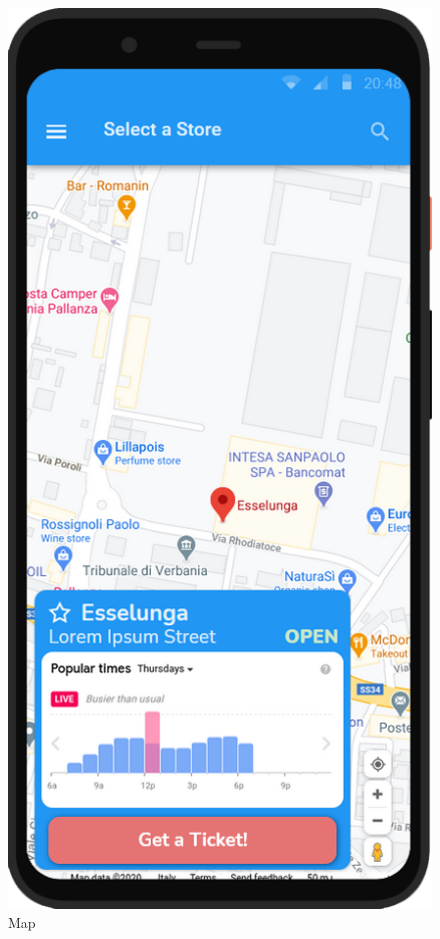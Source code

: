 \begin{figure}[H]
    \centering
    \vspace{-1cm}
    \includegraphics[width=.33\linewidth]{Images/screen_04.png}
    \caption{Map}
    \label{fig:screen4}
\end{figure}

